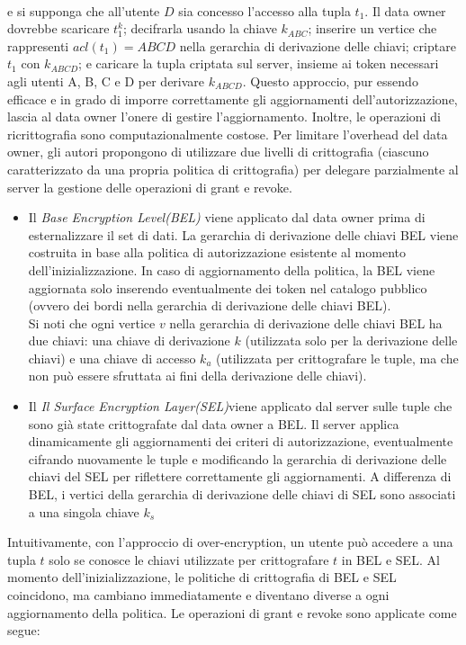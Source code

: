 \\
e si supponga che all'utente $D$ sia concesso l'accesso alla tupla $t_1$. Il data owner dovrebbe scaricare $t^k_1$; decifrarla usando la chiave $k_{ABC}$; inserire un vertice che rappresenti $acl(t_1)=ABCD$ nella gerarchia di derivazione delle chiavi; criptare $t_1$ con $k_{ABCD}$; e caricare la tupla criptata sul server, insieme ai token necessari agli utenti A, B, C e D per derivare $k_{ABCD}$. Questo approccio, pur essendo efficace e in grado di imporre correttamente gli aggiornamenti dell'autorizzazione, lascia al data owner l'onere di gestire l'aggiornamento. Inoltre, le operazioni di ricrittografia sono computazionalmente costose. Per limitare l'overhead del data owner, gli autori propongono di utilizzare due livelli di crittografia (ciascuno caratterizzato da una propria politica di crittografia) per delegare parzialmente al server la gestione delle operazioni di grant e revoke.
\begin{itemize}
    \item Il \textit{Base Encryption Level(BEL)} viene applicato dal data owner prima di esternalizzare il set di dati. La gerarchia di derivazione delle chiavi BEL viene costruita in base alla politica di autorizzazione esistente al momento dell'inizializzazione. In caso di aggiornamento della politica, la BEL viene aggiornata solo inserendo eventualmente dei token nel catalogo pubblico (ovvero dei bordi nella gerarchia di derivazione delle chiavi BEL).\\
    Si noti che ogni vertice $v$ nella gerarchia di derivazione delle chiavi BEL ha due chiavi: una chiave di derivazione $k$ (utilizzata solo per la derivazione delle chiavi) e una chiave di accesso $k_a$ (utilizzata per crittografare le tuple, ma che non può essere sfruttata ai fini della derivazione delle chiavi).
    \item Il \textit{Il Surface Encryption Layer(SEL)}viene applicato dal server sulle tuple che sono già state crittografate dal data owner a BEL. Il server applica dinamicamente gli aggiornamenti dei criteri di autorizzazione, eventualmente cifrando nuovamente le tuple e modificando la gerarchia di derivazione delle chiavi del SEL per riflettere correttamente gli aggiornamenti. A differenza di BEL, i vertici della gerarchia di derivazione delle chiavi di SEL sono associati a una singola chiave $k_s$
\end{itemize}
Intuitivamente, con l'approccio di over-encryption, un utente può accedere a una tupla $t$ solo se conosce le chiavi utilizzate per crittografare $t$ in BEL e SEL. Al momento dell'inizializzazione, le politiche di crittografia di BEL e SEL coincidono, ma cambiano immediatamente e diventano diverse a ogni aggiornamento della politica. Le operazioni di grant e revoke sono applicate come segue:
